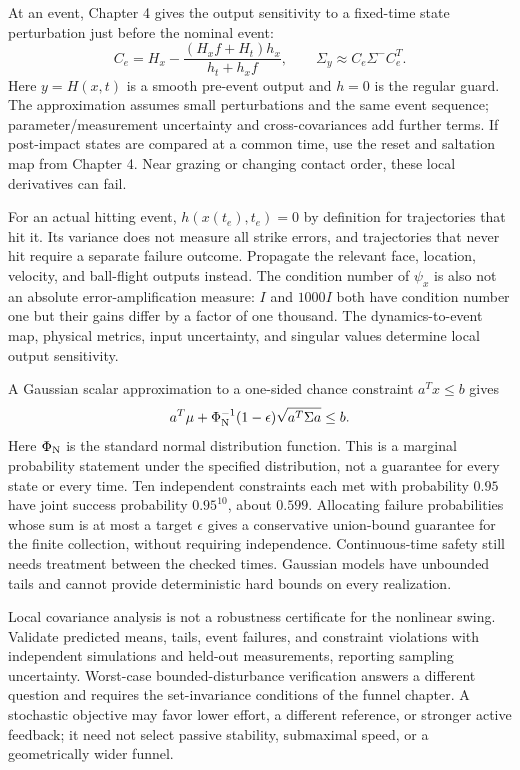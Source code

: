 \documentclass[12pt, openany]{book}
\theoremstyle{plain}
\begin{document}
At an event, Chapter 4 gives the output sensitivity to a fixed-time state
perturbation just before the nominal event:
\begin{equation}\label{eq:ocp_event_output}
 C_e=H_x-\frac{(H_xf+H_t)h_x}{h_t+h_xf},\qquad
 \Sigma_y\approx C_e\Sigma^-C_e^T.
\end{equation}
Here $y=H(x,t)$ is a smooth pre-event output and $h=0$ is the regular guard.
The approximation assumes small perturbations and the same event sequence;
parameter/measurement uncertainty and cross-covariances add further terms.
If post-impact states are compared at a common time, use the reset and
saltation map from Chapter 4. Near grazing or changing contact order, these
local derivatives can fail.

For an actual hitting event, $h(x(t_e),t_e)=0$ by definition for trajectories
that hit it. Its variance does not measure all strike errors, and trajectories
that never hit require a separate failure outcome. Propagate the relevant
face, location, velocity, and ball-flight outputs instead. The condition
number of $\psi_x$ is also not an absolute error-amplification measure:
$I$ and $1000I$ both have condition number one but their gains differ by
a factor of one thousand. The dynamics-to-event map, physical metrics,
input uncertainty, and singular values determine local output sensitivity.

A Gaussian scalar approximation to a one-sided chance constraint
$a^Tx\leq b$ gives
\begin{equation}\label{eq:ocp_chance_constraint}
 a^T\mu+\Phi_{\rm N}^{-1}(1-\epsilon)
 \sqrt{a^T\Sigma a}\leq b.
\end{equation}
Here $\Phi_{\rm N}$ is the standard normal distribution function. This is a
marginal probability statement under the specified distribution, not a
guarantee for every state or every time. Ten independent constraints each
met with probability $0.95$ have joint success probability $0.95^{10}$,
about $0.599$. Allocating failure probabilities whose sum is at most a
target $\epsilon$ gives a conservative union-bound guarantee for the finite
collection, without requiring independence. Continuous-time safety still
needs treatment between the checked times. Gaussian models have unbounded
tails and cannot provide deterministic hard bounds on every realization.

Local covariance analysis is not a robustness certificate for the nonlinear
swing. Validate predicted means, tails, event failures, and constraint
violations with independent simulations and held-out measurements, reporting
sampling uncertainty. Worst-case bounded-disturbance verification answers
a different question and requires the set-invariance conditions of the
funnel chapter. A stochastic objective may favor lower effort, a different
reference, or stronger active feedback; it need not select passive stability,
submaximal speed, or a geometrically wider funnel.
\end{document}
